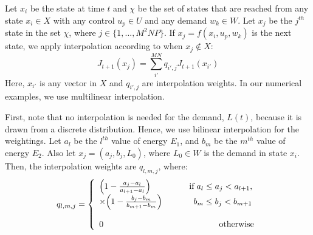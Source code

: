 \documentclass[conference]{IEEEtran}
\begin{document}
Let $x_{i}$ be the state at time $t$ and $\chi$ be the set of states that are reached from any state $x_{i}\in X$ with any control $u_{p}\in U$ and any demand $w_{k}\in W$. Let $x_{j}$ be the $j^{th}$ state in the set $\chi$, where $j\in \{1,...,M^{2}NP\}$. If $x_{j}=f(x_{i},u_{p},w_{k})$ is the next state, we apply interpolation according to \cite[p.~319]{MultiLinInterp} when $x_{j}\not\in X$:
\begin{equation} \label{eq:InterpMap}
	J_{t+1}(x_{j})=\sum_{i'}^{MN}q_{i',j}J_{t+1}(x_{i'})
\end{equation} Here, $x_{i'}$ is any vector in $X$ and $q_{i',j}$ are interpolation weights. In our numerical examples, we use multilinear interpolation.

First, note that no interpolation is needed for the demand, $L(t)$, because it is drawn from a discrete distribution. Hence, we use bilinear interpolation for the weightings. Let $a_{l}$ be the $l^{th}$ value of energy $E_{1}$, and $b_{m}$ be the $m^{th}$ value of energy $E_{2}$. Also let $x_{j}=(a_{j},b_{j},L_{0})$, where $L_{0}\in W$ is the demand in state $x_{i}$. %
Then, the interpolation weights are $q_{l,m,j}$, where:
\begin{displaymath}q_{l,m,j}=
\left\{
\begin{array}{l}
\Big(1-\frac{a_{j}-a_{l}}{a_{l+1}-a_{l}}\Big) \hspace{1.6cm} \text{if} \hspace{0.1cm} a_{l}\leq a_{j}< a_{l+1},\\ \times \Big(1-\frac{b_{j}-b_{m}}{b_{m+1}-b_{m}}\Big) \hspace{1.3cm}b_{m}\leq b_{j}< b_{m+1}\\\\
0		   \hspace{4.8cm} \text{otherwise}
\end{array}
\right.
\end{displaymath}
\end{document}
